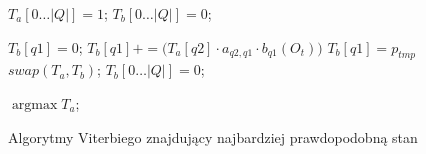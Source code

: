 \documentclass[11pt]{article}
\DeclareMathOperator*{\argmax}{\arg\max}   %
\begin{document}
		  \begin{figure}
			  \begin{algorithmic}[1]
		  		
		  		
		  	  	  \STATE $T_a[0 \ldots |Q|] = 1$;
		  		  \STATE $T_b[0 \ldots |Q|] = 0$;
		  		
				  		  \STATE $T_b[q1] = 0$;
					  		  \STATE $T_b[q1] += \bigg( T_a[q2]\cdot a_{q2,q1}\cdot b_{q1}(O_t) \bigg)$					  		  
				  		  \ENDFOR
				  		  \STATE $T_b[q1] = p_{tmp}$
			  		  \ENDFOR
			  		  \STATE $swap(T_a, T_b)$;
			  		  \STATE $T_b[0 \ldots |Q|] = 0$;
		  		  \ENDFOR
		  		
		  		  \RETURN $\argmax{T_a}$;
			  \end{algorithmic}
			  \caption{Algorytmy Viterbiego znajdujący najbardziej prawdopodobną stan}
		  	  \label{alg:viterbi2}
		  \end{figure}	   
		   
\end{document}
